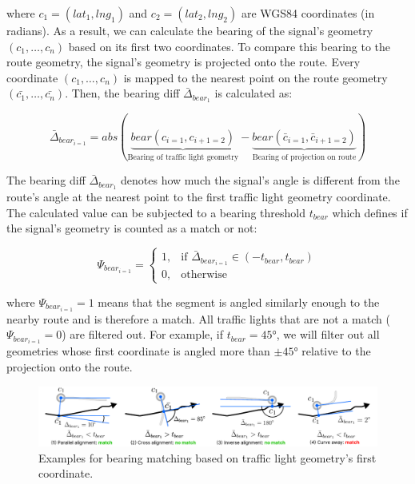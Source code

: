where $c_1 = (lat_1, lng_1)$ and $c_2 = (lat_2, lng_2)$ are WGS84 coordinates (in radians). As a result, we can calculate the bearing of the signal's geometry $(c_1, \dots, c_n)$ based on its first two coordinates. To compare this bearing to the route geometry, the signal's geometry is projected onto the route. Every coordinate $(c_1, \dots, c_n)$ is mapped to the nearest point on the route geometry $(\bar{c_1}, \dots, \bar{c_n})$. Then, the bearing diff $\bar{\Delta}_{bear_1}$ is calculated as:

\begin{equation}
    \bar{\Delta}_{bear_{i=1}} = 
        abs(\underbrace{bear(c_{i=1}, c_{i+1=2})}_{\text{Bearing of traffic light geometry}} - \underbrace{bear(\bar{c}_{i=1}, \bar{c}_{i+1=2})}_{\text{Bearing of projection on route}})
\end{equation}

The bearing diff $\bar{\Delta}_{bear_1}$ denotes how much the signal's angle is different from the route's angle at the nearest point to the first traffic light geometry coordinate. The calculated value can be subjected to a bearing threshold $t_{bear}$ which defines if the signal's geometry is counted as a match or not:

\begin{equation}
\Psi_{bear_{i=1}} = 
    \begin{cases}
            1,& \text{if } \bar{\Delta}_{bear_{i=1}} \in \left(-t_{bear}, t_{bear}\right)\\
            0,              & \text{otherwise}
        \end{cases}
\end{equation}

where $\Psi_{bear_{i=1}} = 1$ means that the segment is angled similarly enough to the nearby route and is therefore a match. All traffic lights that are not a match ($\Psi_{bear_{i=1}} = 0$) are filtered out. For example, if $t_{bear} = 45°$, we will filter out all geometries whose first coordinate is angled more than $\pm 45°$ relative to the projection onto the route. 

\begin{figure}[htbp]
\centering
\includegraphics[width=\linewidth]{images/sg-selection-bearing-filter.pdf}
\caption{Examples for bearing matching based on traffic light geometry's first coordinate.}
\label{fig:sg-selection-bearing-filter}
\end{figure}


